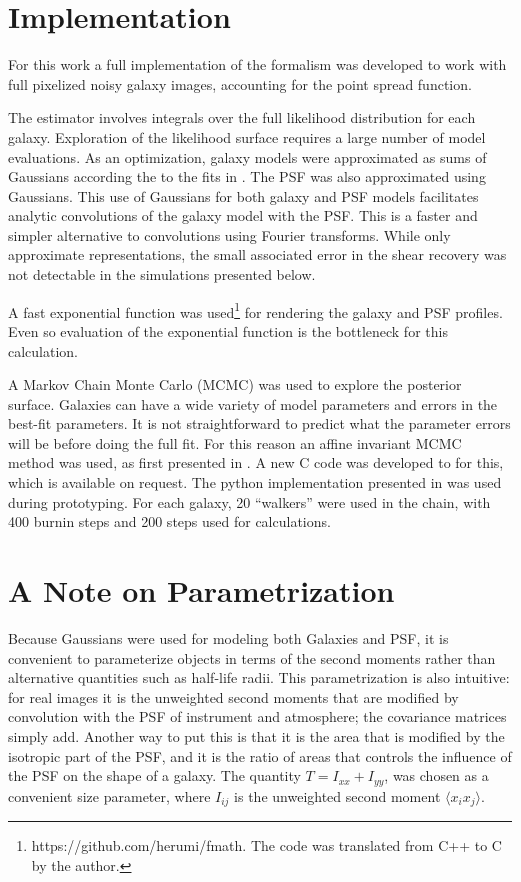 \documentclass[12pt,preprint]{aastex}
\begin{document}
\section{Implementation} \label{sec:impl}

For this work a full implementation of the \citet{ba13} formalism was developed
to work with full pixelized noisy galaxy images, accounting for the point
spread function.


The estimator involves integrals over the full likelihood distribution for each
galaxy.  Exploration of the likelihood surface requires a large number of model
evaluations.  As an optimization, galaxy models were approximated as sums of
Gaussians according the to the fits in \citet{HoggGMix12}.  The PSF was also
approximated using Gaussians.  This use of Gaussians for both galaxy and PSF
models facilitates analytic convolutions of the galaxy model with the PSF.
This is a faster and simpler alternative to convolutions using Fourier
transforms. While only approximate representations, the small associated error
in the shear recovery was not detectable in the simulations presented below.

A fast exponential function was used\footnote{https://github.com/herumi/fmath.
The code was translated from C++ to C by the author.} for rendering the galaxy
and PSF profiles.  Even so evaluation of the exponential function is the
bottleneck for this calculation.

A Markov Chain Monte Carlo (MCMC) was used to explore the posterior surface.
Galaxies can have a wide variety of model parameters and errors in the best-fit
parameters.  It is not straightforward to predict what the parameter errors
will be before doing the full fit.  For this reason an affine invariant MCMC
method was used, as first presented in \citet{GoodmanWeare10}.  A new C code
was developed to for this, which is available on request. The python
implementation presented in \citet{Mackey13} was used during prototyping.  For
each galaxy, 20 ``walkers'' were used in the chain, with 400 burnin steps and
200 steps used for calculations.

\section{A Note on Parametrization}

Because Gaussians were used for modeling both Galaxies and PSF, it is
convenient to parameterize objects in terms of the second moments rather than
alternative quantities such as half-life radii.  This parametrization is also
intuitive: for real images it is the unweighted second moments that are
modified by convolution with the PSF of instrument and atmosphere; the
covariance matrices simply add. Another way to put this is that it is the area
that is modified by the isotropic part of the PSF, and it is the ratio of areas
that controls the influence of the PSF on the shape of a galaxy.  The quantity
$T = I_{xx} + I_{yy}$, was chosen as a convenient size parameter, where
$I_{ij}$ is the unweighted second moment $\langle x_i x_j \rangle$.
\end{document}
